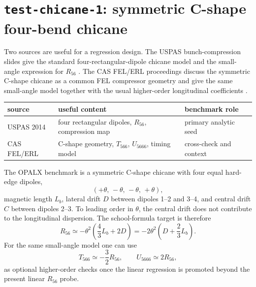 \documentclass[11pt]{article}
\newcommand{\code}[1]{\texttt{#1}}
\begin{document}
\section{\code{test-chicane-1}: symmetric C-shape four-bend chicane}

Two sources are useful for a regression design.  The
USPAS bunch-compression slides give the standard four-rectangular-dipole
chicane model and the small-angle expression for \(R_{56}\)
\cite{uspas2014bunchcompression}.  The CAS FEL/ERL proceedings discuss the
symmetric C-shape chicane as a common FEL compressor geometry and give the
same small-angle model together with the usual higher-order longitudinal
coefficients \cite{dimitri2018}.

\begin{center}
\begin{tabular}{@{}lll@{}}
\toprule
source & useful content & benchmark role \\
\midrule
USPAS 2014 & four rectangular dipoles, \(R_{56}\), compression map &
primary analytic seed \\
CAS FEL/ERL & C-shape geometry, \(T_{566}\), \(U_{5666}\), timing model &
cross-check and context \\
\bottomrule
\end{tabular}
\end{center}

The OPALX benchmark is a symmetric C-shape chicane with four equal hard-edge
dipoles,
\[
  (+\theta,\,-\theta,\,-\theta,\,+\theta),
\]
magnetic length \(L_b\), lateral drift \(D\) between dipoles 1--2 and 3--4,
and central drift \(C\) between dipoles 2--3.  To leading order in
\(\theta\), the central drift does not contribute to the longitudinal
dispersion.  The school-formula target is therefore
\[
  R_{56}
    \simeq
    -\theta^2\left(\frac{4}{3}L_b + 2D\right)
    =
    -2\theta^2\left(D+\frac{2}{3}L_b\right).
\]
For the same small-angle model one can use
\[
  T_{566} \simeq -\frac{3}{2}R_{56},
  \qquad
  U_{5666} \simeq 2R_{56},
\]
as optional higher-order checks once the linear regression is promoted beyond
the present linear \(R_{56}\) probe.
\end{document}
